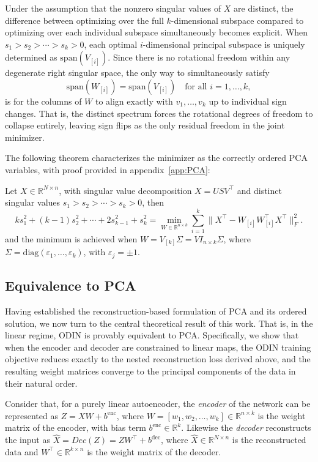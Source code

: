 \documentclass[twoside,11pt]{article}
\begin{document}
Under the assumption that the nonzero singular values of $X$ are distinct, the difference between optimizing over the full $k$-dimensional subspace compared to optimizing over each individual subspace simultaneously becomes explicit. When $s_1 > s_2 > \cdots > s_k > 0$,
each optimal $i$-dimensional principal subspace is uniquely determined as
$\mathrm{span}(V_{[i]})$. Since there is no rotational freedom within any degenerate
right singular space, the only way to simultaneously satisfy
\begin{equation}
    \mathrm{span}(W_{[i]}) = \mathrm{span}(V_{[i]}) \quad \text{for all } i = 1,
    \ldots, k,
\end{equation}
is for the columns of $W$ to align exactly with $v_1, \ldots, v_k$ up to individual
sign changes. That is, the distinct spectrum forces the rotational degrees of freedom
to collapse entirely, leaving sign flips as the only residual freedom in the joint
minimizer. 

The following theorem characterizes the minimizer as the correctly ordered PCA variables, with proof provided in appendix~\ref{app:PCA}:
\begin{theorem}
    Let $X \in \mathbb{R}^{N \times n}$, with singular value decomposition $X=USV^\top$ and distinct singular values $s_1>s_2>\cdots>s_k>0$, then 
\[ k s_1^2 + (k-1)s_2^2 + \cdots + 2 s_{k-1}^2 + s_k^2 = \min_{W \in \mathbb{R}^{n \times k}} \sum_{i=1}^k \|X^\top-W_{[i]}W_{[i]}^\top X^\top\|_F^2. \]
and the minimum is achieved when $W=V_{[k]}\Sigma=VI_{n\times k}\Sigma$, where $\Sigma = \mathrm{diag}(\varepsilon_1, \dots, \varepsilon_k)$, with $\varepsilon_j = \pm 1$.
\label{thm:dend_loss}
\end{theorem}

\subsection{Equivalence to PCA}
Having established the reconstruction-based formulation of PCA and its ordered solution, we now turn to the central theoretical result of this work. That is, in the linear regime, ODIN is provably equivalent to PCA. Specifically, we show that when the encoder and decoder are constrained to linear maps, the ODIN training objective reduces exactly to the nested reconstruction loss derived above, and the resulting weight matrices converge to the principal components of the data in their natural order.

Consider that, for a purely linear autoencoder, the \emph{encoder} of the network can be represented as \( Z = X W + b^{\text{enc}} \), where \( W = [w_1, w_2,\dots, w_k] \in \mathbb{R}^{n \times k} \) is the weight matrix of the encoder, with bias term \( b^{\text{enc}} \in \mathbb{R}^k \). Likewise the \emph{decoder} reconstructs the input as \( \hat{X} = Dec(Z)= Z W^\top + b^{\text{dec}} \), where \( \hat{X} \in \mathbb{R}^{N \times n} \) is the reconstructed data and \( W^\top \in \mathbb{R}^{k \times n} \) is the weight matrix of the decoder.
\end{document}
